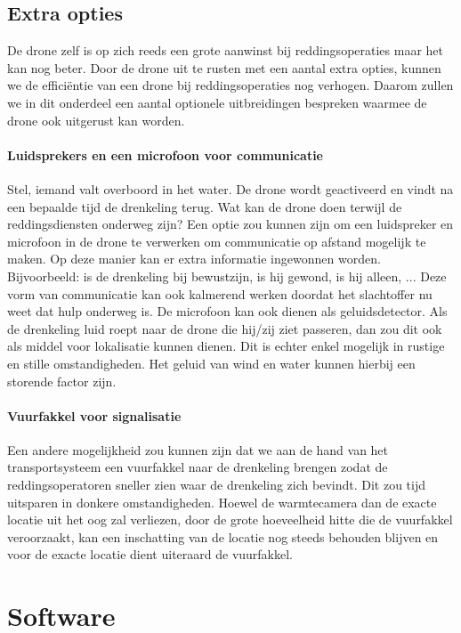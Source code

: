 \subsection{Extra opties}

De drone zelf is op zich reeds een grote aanwinst bij reddingsoperaties maar het kan nog beter. Door de drone uit te rusten met een aantal extra opties, kunnen we de efficiëntie van een drone bij reddingsoperaties nog verhogen. Daarom zullen we in dit onderdeel een aantal optionele uitbreidingen bespreken waarmee de drone ook uitgerust kan worden.  

\paragraph{Luidsprekers en een microfoon voor communicatie}

Stel, iemand valt overboord in het water. De drone wordt geactiveerd en vindt na een bepaalde tijd de drenkeling terug. Wat kan de drone doen terwijl de reddingsdiensten onderweg zijn? Een optie zou kunnen zijn om een luidspreker en microfoon in de drone te verwerken om communicatie op afstand mogelijk te maken. Op deze manier kan er extra informatie ingewonnen worden. Bijvoorbeeld: is de drenkeling bij bewustzijn, is hij gewond, is hij alleen, ... Deze vorm van communicatie kan ook kalmerend werken doordat het slachtoffer nu weet dat hulp onderweg is. 
De microfoon kan ook dienen als geluidsdetector. Als de drenkeling luid roept naar de drone die hij/zij ziet passeren, dan zou dit ook als middel voor lokalisatie kunnen dienen. Dit is echter enkel mogelijk in rustige en stille omstandigheden. Het geluid van wind en water kunnen hierbij een storende factor zijn. 

\paragraph{Vuurfakkel voor signalisatie}

Een andere mogelijkheid zou kunnen zijn dat we aan de hand van het transportsysteem een vuurfakkel naar de drenkeling brengen zodat de reddingsoperatoren sneller zien waar de drenkeling zich bevindt. Dit zou tijd uitsparen in donkere omstandigheden. Hoewel de warmtecamera dan de exacte locatie uit het oog zal verliezen, door de grote hoeveelheid hitte die de vuurfakkel veroorzaakt, kan een inschatting van de locatie nog steeds behouden blijven en voor de exacte locatie dient uiteraard de vuurfakkel. 

\section{Software}

